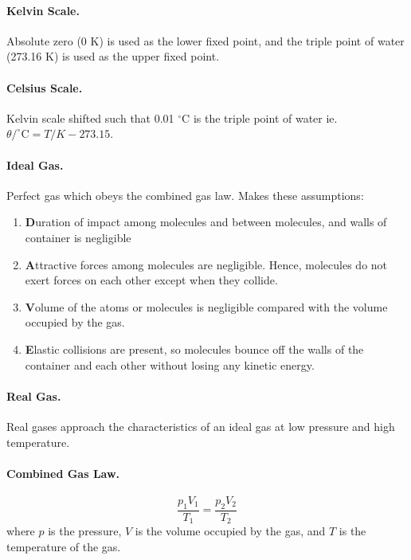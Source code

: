 \documentclass{article}
\begin{document}
\paragraph{Kelvin Scale.} Absolute zero (0 K) is used as the lower fixed point,
and the triple point of water (273.16 K) is used as the upper fixed point.

\paragraph{Celsius Scale.} Kelvin scale shifted such that 0.01 $^{\circ}$C is
the triple point of water ie. $\theta/^{\circ}\mathrm{C} = T/K - 273.15$.

\paragraph{Ideal Gas.} Perfect gas which obeys the combined gas law. Makes these
assumptions:

\begin{enumerate} \item \textbf{D}uration of impact among molecules and between
    molecules, and walls of container is negligible \item \textbf{A}ttractive
      forces among molecules are negligible. Hence, molecules do not exert
      forces on each other except when they collide.  \item \textbf{V}olume of
      the atoms or molecules is negligible compared with the volume occupied by
    the gas.  \item \textbf{E}lastic collisions are present, so molecules bounce
      off the walls of the container and each other without losing any kinetic
      energy.  \end{enumerate}

\paragraph{Real Gas.} Real gases approach the characteristics of an ideal gas at
low pressure and high temperature.

\paragraph{Combined Gas Law.} \begin{equation} \frac{p_1V_1}{T_1} =
\frac{p_2V_2}{T_2} \end{equation} where $p$ is the pressure, $V$ is the volume
occupied by the gas, and $T$ is the temperature of the gas.
\end{document}
